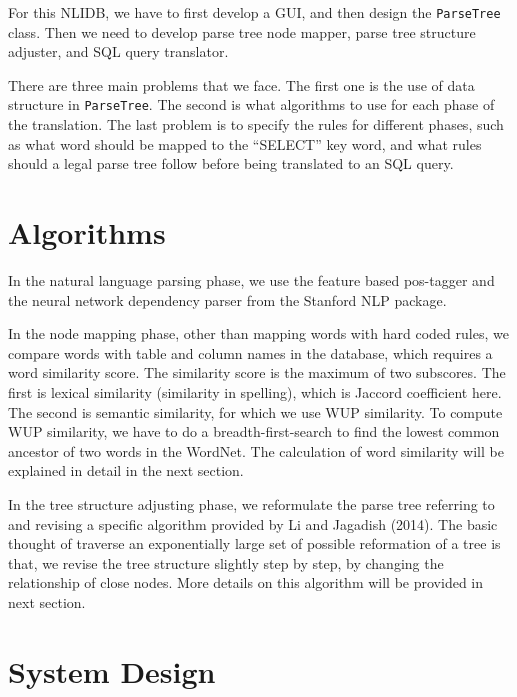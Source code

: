 \documentclass[twocolumn]{article}
\begin{document}
For this NLIDB, we have to first develop a GUI, and then design the \texttt{ParseTree} class. Then we need to develop parse tree node mapper, parse tree structure adjuster, and SQL query translator.

There are three main problems that we face. The first one is the use of data structure in \texttt{ParseTree}. The second is what algorithms to use for each phase of the translation. The last problem is to specify the rules for different phases, such as what word should be mapped to the ``SELECT'' key word, and what rules should a legal parse tree follow before being translated to an SQL query.

\section{Algorithms}

In the natural language parsing phase, we use the feature based pos-tagger\cite{toutanova2003feature} and the neural network dependency parser\cite{chen2014fast} from the Stanford NLP package.

In the node mapping phase, other than mapping words with hard coded rules, we compare words with table and column names in the database, which requires a word similarity score. The similarity score is the maximum of two subscores. The first is lexical similarity (similarity in spelling), which is Jaccord coefficient here. The second is semantic similarity, for which we use WUP similarity\cite{wu1994verbs}. To compute WUP similarity, we have to do a breadth-first-search to find the lowest common ancestor of two words in the WordNet. The calculation of word similarity will be explained in detail in the next section.

In the tree structure adjusting phase, we reformulate the parse tree referring to and revising a specific algorithm provided by Li and Jagadish (2014)\cite{li2014}. The basic thought of traverse an exponentially large set of possible reformation of a tree is that, we revise the tree structure slightly step by step, by changing the relationship of close nodes. More details on this algorithm will be provided in next section.

\section{System Design}
\end{document}
